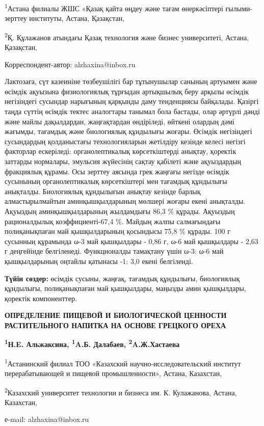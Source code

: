 \textsuperscript{1}Астана филиалы ЖШС «Қазақ қайта өңдеу және тағам
өнеркәсіптері ғылыми-зерттеу институты, Астана, Қазақстан,

\textsuperscript{2}Қ. Құлажанов атындағы Қазақ технология және бизнес
университеті, Астана, Қазақстан,

Корреспондент-автор: alzhaxina@inbox.ru

Лактозаға, сүт казеиніне төзбеушілігі бар тұтынушылар санының артуымен
және өсімдік ақуызына физиологиялық тұрғыдан артықшылық беру арқылы
өсімдік негізіндегі сусындар нарығының қарқынды даму тенденциясы
байқалады. Қазіргі таңда сүттің өсімдік тектес аналогтары танымал бола
бастады, олар әртүрлі дәнді және майлы дақылдардан, жаңғақтардан
өндіріледі, өйткені олардың дәмі жағымды, тағамдық және биологиялық
құндылығы жоғары. Өсімдік негізіндегі сусындардың қолданыстағы
технологияларын жетілдіру кезінде келесі негізгі факторлар ескеріледі:
органолептикалық көрсеткіштерді анықтау, қоректік заттарды нормалары,
эмульсия жүйесінің сақтау қабілеті және ақуыздардың фракциялық құрамы.
Осы зерттеу аясында грек жаңғағы негізде өсімдік сусынының
органолептикалық көрсеткіштері мен тағамдық құндылығы анықталды.
Биологиялық құндылығын анықтау кезінде барлық алмастырылмайтын
аминқышқылдарының мөлшері жоғары екені анықталды. Ақуыздың
аминқышқылдарының жылдамдығы 86,3 \% құрады. Ақуыздың рационалдылық
коэффициенті-67,4 \%. Майдың жалпы салмағындағы полиқанықпаған май
қышқылдарының қосындысы 75,8 \% құрады. 100 г сусынның құрамында ω-3 май
қышқылдары - 0,86 г, ω-6 май қышқылдары - 2,63 г деңгейінде белгіленеді.
Функционалды тамақтану үшін ω-3: ω-6 май қышқылдарының оңтайлы қатынасы
-1: 3,0 екені белгіленді.

{\bfseries Түйін сөздер:} өсімдік сусыны, жаңғақ, тағамдық құндылығы,
биологиялық құндылығы, полиқанықпаған май қышқылдары, маңызды амин
қышқылдары, қоректік компоненттер.

{\bfseries ОПРЕДЕЛЕНИЕ ПИЩЕВОЙ И БИОЛОГИЧЕСКОЙ ЦЕННОСТИ РАСТИТЕЛЬНОГО
НАПИТКА НА ОСНОВЕ ГРЕЦКОГО ОРЕХА}

{\bfseries \textsuperscript{1}Н.E. Альжаксина, \textsuperscript{1}A.Б.
Далабаев, \textsuperscript{2}A.Ж.Хастаева}

\textsuperscript{1}Астанинский филиал ТОО «Казахский
научно-исследовательский институт перерабатывающей и пищевой
промышленности», Астана, Казахстан,

\textsuperscript{2}Казахский университет технологии и бизнеса им. К.
Кулажанова, Астана, Казахстан,

е-mail: alzhaxina@inbox.ru

